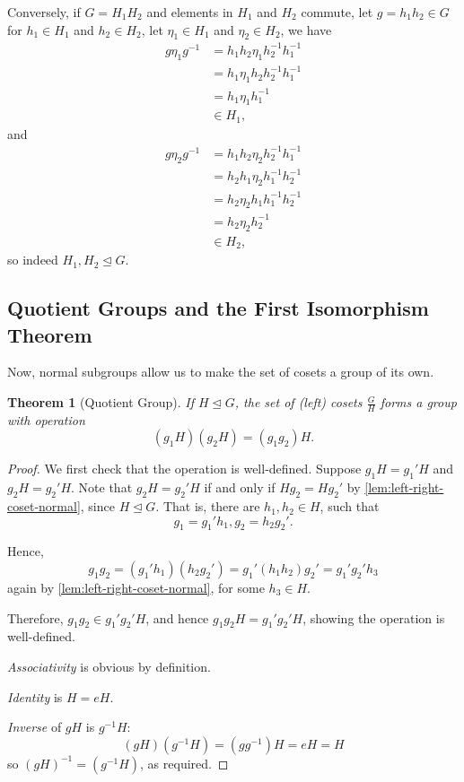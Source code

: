 \documentclass{article}
\newtheorem{theorem}{Theorem}[section]
\theoremstyle{definition}
\theoremstyle{remark}
\newcommand{\pqty}[1]{\left(#1\right)}
\newcommand{\flatfrac}[2]{\frac{#1}{#2}}
\newcommand{\inverse}{^{-1}}
\newcommand{\normalsub}{\trianglelefteq}
\begin{document}
Conversely, if \(G = H_1 H_2\) and elements in \(H_1\) and \(H_2\) commute, let \(g = h_1 h_2 \in G\) for \(h_1 \in H_1\) and \(h_2 \in H_2\), let \(\eta_1 \in H_1\) and \(\eta_2 \in H_2\), we have
\begin{align*}
    g \eta_1 g\inverse &= h_1 h_2 \eta_1 h_2\inverse h_1\inverse \\
    &= h_1 \eta_1 h_2 h_2\inverse h_1\inverse \\
    &= h_1 \eta_1 h_1\inverse \\
    &\in H_1,
\end{align*}
and
\begin{align*}
    g \eta_2 g\inverse &= h_1 h_2 \eta_2 h_2\inverse h_1\inverse \\
    &= h_2 h_1 \eta_2 h_1\inverse h_2\inverse \\
    &= h_2 \eta_2 h_1 h_1\inverse h_2\inverse \\
    &= h_2 \eta_2 h_2\inverse \\
    &\in H_2,
\end{align*}
so indeed \(H_1, H_2 \normalsub G\).

\subsection{Quotient Groups and the First Isomorphism Theorem}
\label{sec:quotient-groups-isomorphism-theorem}

Now, normal subgroups allow us to make the set of cosets a group of its own.

\begin{theorem}[Quotient Group]
    \label{thm:quotient-group}%
    If \(H \normalsub G\), the set of (left) cosets \(\flatfrac{G}{H}\) forms a group with operation
    \[
        \pqty{g_1 H} \pqty{g_2 H} = \pqty{g_1 g_2} H.
    \]
\end{theorem}

\begin{proof}
    We first check that the operation is well-defined. Suppose \(g_1 H = g_1' H\) and \(g_2 H = g_2' H\). Note that \(g_2 H = g_2' H\) if and only if \(H g_2 = H g_2'\) by \autoref{lem:left-right-coset-normal}, since \(H \normalsub G\). That is, there are \(h_1, h_2 \in H\), such that
    \[
        g_1 = g_1' h_1, g_2 = h_2 g_2'.
    \]

    Hence,
    \[
        g_1 g_2 = \pqty{g_1' h_1} \pqty{h_2 g_2'} = g_1' \pqty{h_1 h_2} g_2' = g_1' g_2' h_3
    \]
    again by \autoref{lem:left-right-coset-normal}, for some \(h_3 \in H\).

    Therefore, \(g_1 g_2 \in g_1' g_2' H\), and hence \(g_1 g_2 H = g_1' g_2' H\), showing the operation is well-defined.

    \emph{Associativity} is obvious by definition.

    \emph{Identity} is \(H = eH\).

    \emph{Inverse} of \(gH\) is \(g\inverse H\):
    \[
        \pqty{gH} \pqty{g\inverse H} = \pqty{g g\inverse} H = eH = H
    \]
    so \(\pqty{gH}\inverse = \pqty{g\inverse H}\), as required.
\end{proof}
\end{document}
